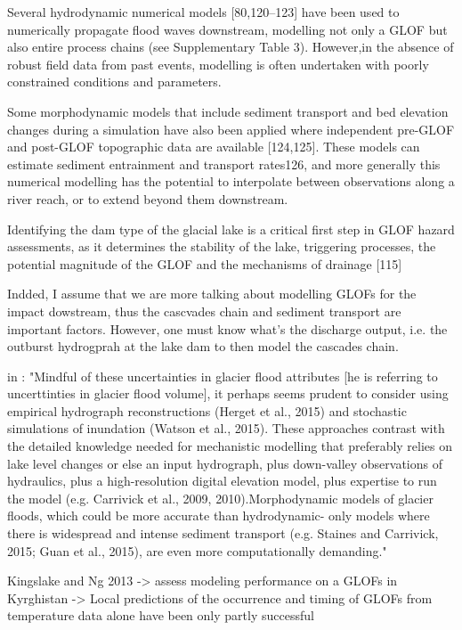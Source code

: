 Several hydrodynamic numerical models [80,120–123] have been used to
numerically propagate flood waves downstream, modelling not only a
GLOF but also entire process chains (see Supplementary Table 3). However,in the absence of robust field data from past events, modelling is often undertaken with poorly constrained conditions and parameters.

Some morphodynamic models that include sediment transport and bed elevation changes during a simulation have also been applied where independent pre-GLOF and post-GLOF topographic data are available [124,125]. These models can estimate sediment entrainment and transport rates126, and more generally this numerical modelling has the potential to interpolate between observations along a river reach, or to extend beyond them downstream.

Identifying the dam type of the glacial lake is a critical first step in GLOF hazard assessments, as it determines the stability of the lake, triggering processes, the potential magnitude of the GLOF and the mechanisms of drainage [115]

Indded, I assume that we are more talking about modelling GLOFs for the impact dowstream, thus the cascvades chain and sediment transport are  important factors. However, one must know what's the discharge output, i.e. the outburst hydrogprah at the lake dam to then model the cascades chain.

in \cite{Carrivick&Tweed2016}: "Mindful of these uncertainties in glacier flood attributes [he is referring to uncerttinties in glacier flood volume], it perhaps
seems prudent to consider using empirical hydrograph reconstructions
(Herget et al., 2015) and stochastic simulations of inundation (Watson
et al., 2015). These approaches contrast with the detailed knowledge
needed for mechanistic modelling that preferably relies on lake level
changes or else an input hydrograph, plus down-valley observations
of hydraulics, plus a high-resolution digital elevation model, plus expertise
to run the model (e.g. Carrivick et al., 2009, 2010).Morphodynamic
models of glacier floods, which could be more accurate than hydrodynamic-
only models where there is widespread and intense sediment
transport (e.g. Staines and Carrivick, 2015; Guan et al., 2015), are even
more computationally demanding."

Kingslake and Ng 2013 -> assess modeling performance on a GLOFs in Kyrghistan -> Local predictions of the occurrence and timing of GLOFs from temperature data alone have been only partly successful


